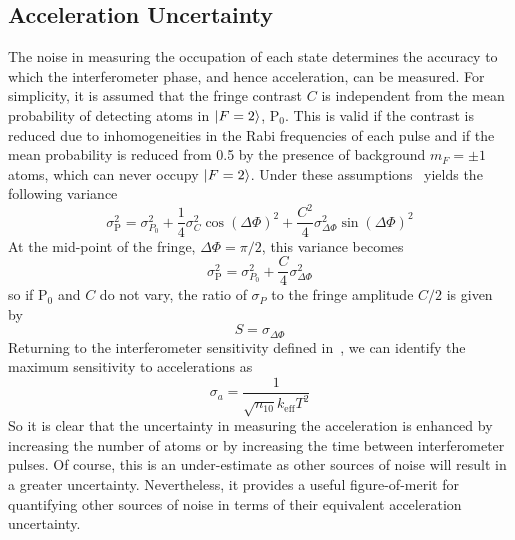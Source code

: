 \subsection{Acceleration Uncertainty}\label{subsec:accel_uncert}
The noise in measuring the occupation of each state determines the
accuracy to which the interferometer phase, and hence acceleration,
can be measured.
For simplicity, it is assumed that the fringe contrast $C$ is
independent from the mean probability of detecting atoms in
$\ket{F=2}$, $\text{P}_0$. This is valid if the contrast is reduced due to
inhomogeneities in the Rabi frequencies of each pulse and if the mean
probability is reduced from 0.5 by the presence of background $m_F=\pm
1$ atoms,
which can never occupy $\ket{F=2}$. Under these
assumptions~ yields the following variance
\begin{equation}
  \sigma_\text{P}^2 = \sigma_{P_0}^2 + \frac{1}{4} \sigma_C^2
  \cos(\Delta \Phi)^2 + \frac{C^2}{4}\sigma_{\Delta \Phi}^2 \sin(\Delta \Phi)^2
\end{equation}
At the mid-point of the fringe, $\Delta \Phi = \pi/2$, this variance
becomes
\begin{equation}
  \sigma_\text{P}^2 = \sigma_{P_0}^2 + 
  \frac{C}{4}\sigma_{\Delta \Phi}^2 
\end{equation}
so if $\text{P}_0$ and $C$ do not vary, the ratio of $\sigma_P$ to the
fringe amplitude $C/2$ is
given by
\begin{equation}
  S = \sigma_{\Delta \Phi}
\end{equation}
Returning to the interferometer sensitivity defined
in~, we can identify the maximum sensitivity
to accelerations as 
\begin{equation}
  \sigma_a = \frac{1}{\sqrt{n_{10}} k_\text{eff} T^2}
\end{equation}
So it is clear that the uncertainty in measuring the acceleration is enhanced by
increasing the number of atoms or by increasing the time between
interferometer pulses. Of course, this is an under-estimate as other sources of noise will result in a
greater uncertainty. Nevertheless, it provides a useful
figure-of-merit for quantifying other sources of noise in terms of
their equivalent acceleration uncertainty. 


